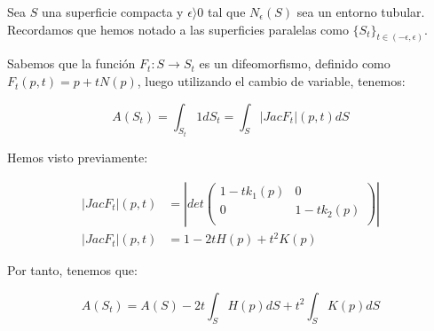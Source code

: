 \begin{remark}
Sea $S$ una superficie compacta y $\epsilon  \rangle  0$ tal que $N_\epsilon(S)$ sea un entorno tubular. Recordamos que hemos notado a las superficies paralelas como $\{S_t\}_{t \in (-\epsilon, \epsilon)}$.

Sabemos que la función $F_t: S \longrightarrow S_t$ es un difeomorfismo, definido como $F_t(p, t) = p + tN(p)$, luego utilizando el cambio de variable, tenemos:

\begin{equation*}
    A(S_t) = \int_{S_t} 1dS_t = \int_S |Jac F_t|(p,t)dS
\end{equation*}

Hemos visto previamente:

\begin{align*}
    |Jac F_t|(p,t) &= \left|
  det \left( {\begin{array}{cc}
   1 - tk_1(p) & 0 \\
   0 & 1-tk_2(p) \\
  \end{array} } \right) \right| \\
  |Jac F_t|(p,t) &= 1-2tH(p) + t^2K(p)
\end{align*}

Por tanto, tenemos que:

\begin{equation*}\label{areaparallelsurface}
    A(S_t) = A(S) -2t\int_{S} H(p)dS + t^2\int_{S} K(p)dS
\end{equation*}
\end{remark}
